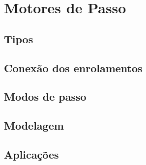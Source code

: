 \section{Motores de Passo}



\subsection{Tipos}



\subsection{Conexão dos enrolamentos}



\subsection{Modos de passo}



\subsection{Modelagem}



\subsection{Aplicações}



